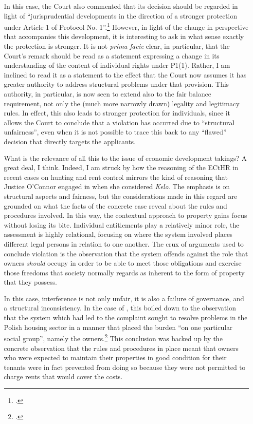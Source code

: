 \documentclass[12pt,a4paper]{book} %
\begin{document}
In this case, the Court also commented that its decision should be regarded in light of ``jurisprudential developments in the direction of a stronger protection under Article 1 of Protocol No. 1''.\footcite[135]{lindheim12} However, in light of the change in perspective that accompanies this development, it is interesting to ask in what sense exactly the protection is stronger. It is not {\it prima facie} clear, in particular, that the Court's remark should be read as a statement expressing a change in its understanding of the content of individual rights under P1(1). Rather, I am inclined to read it as a statement to the effect that the Court now assumes it has greater authority to address structural problems under that provision. This authority, in particular, is now seen to extend also to the fair balance requirement, not only the (much more narrowly drawn) legality and legitimacy rules. In effect, this also leads to stronger protection for individuals, since it allows the Court to conclude that a violation has occurred due to ``structural unfairness'', even when it is not possible to trace this back to any ``flawed'' decision that directly targets the applicants.

What is the relevance of all this to the issue of economic development takings? A great deal, I think. Indeed, I am struck by how the reasoning of the ECtHR in recent cases on hunting and rent control mirrors the kind of reasoning that Justice O'Connor engaged in when she considered {\it Kelo}. The emphasis is on structural aspects and fairness, but the considerations made in this regard are grounded on what the facts of the concrete case reveal about the rules and procedures involved. In this way, the contextual approach to property gains focus without losing its bite. Individual entitlements play a relatively minor role, the assessment is highly relational, focusing on where the system involved places different legal persons in relation to one another. The crux of arguments used to conclude violation is the observation that the system offends against the role that owners {\it should} occupy in order to be able to meet those obligations and exercise those freedoms that society normally regards as inherent to the form of property that they possess.

In this case, interference is not only unfair, it is also a failure of governance, and a structural inconsistency. In the case of \textcite{hutten06}, this boiled down to the observation that the system which had led to the complaint sought to resolve problems in the Polish housing sector in a manner that placed the burden ``on one particular social group'', namely the owners.\footcite[225]{hutten06} This conclusion was backed up by the concrete observation that the rules and procedures in place meant that owners who were expected to maintain their properties in good condition for their tenants were in fact prevented from doing so because they were not permitted to charge rents that would cover the costs.
\end{document}

